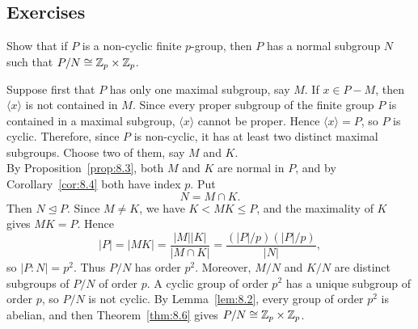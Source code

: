 \documentclass[../Odyssey_Project.tex]{subfiles}
\begin{document}
\subsection*{Exercises}

\begin{exercise}
\label{ex:8.1}
Show that if $P$ is a non-cyclic finite $p$-group, then $P$ has a normal subgroup $N$ such that $P/N \cong \mathbb{Z}_p \times \mathbb{Z}_p$.
\end{exercise}
\begin{solution}
Suppose first that $P$ has only one maximal subgroup, say $M$. If $x\in P-M$, then $\langle x\rangle$ is not contained in $M$. Since every proper subgroup of the finite group $P$ is contained in a maximal subgroup, $\langle x\rangle$ cannot be proper. Hence $\langle x\rangle=P$, so $P$ is cyclic. Therefore, since $P$ is non-cyclic, it has at least two distinct maximal subgroups. Choose two of them, say $M$ and $K$.\\
By Proposition~\ref{prop:8.3}, both $M$ and $K$ are normal in $P$, and by Corollary~\ref{cor:8.4} both have index $p$. Put
\[
    N=M\cap K.
\]
Then $N\trianglelefteq P$. Since $M\neq K$, we have $K<MK\leq P$, and the maximality of $K$ gives $MK=P$. Hence
\[
    \lvert P\rvert=\lvert MK\rvert
    =\frac{\lvert M\rvert\lvert K\rvert}{\lvert M\cap K\rvert}
    =\frac{(\lvert P\rvert/p)(\lvert P\rvert/p)}{\lvert N\rvert},
\]
so $\lvert P:N\rvert=p^2$. Thus $P/N$ has order $p^2$. Moreover, $M/N$ and $K/N$ are distinct subgroups of $P/N$ of order $p$. A cyclic group of order $p^2$ has a unique subgroup of order $p$, so $P/N$ is not cyclic. By Lemma~\ref{lem:8.2}, every group of order $p^2$ is abelian, and then Theorem~\ref{thm:8.6} gives $P/N\cong \mathbb{Z}_p\times \mathbb{Z}_p$.
\end{solution}
\end{document}
